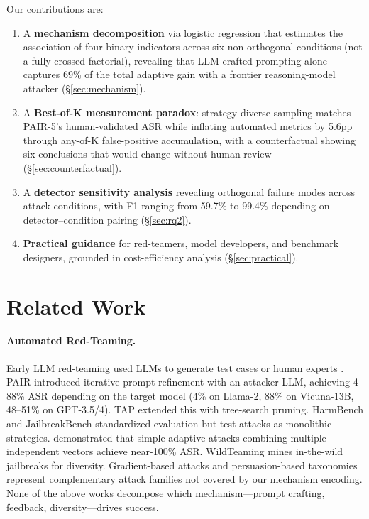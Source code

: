 \documentclass[11pt]{article}
\begin{document}
Our contributions are:

\begin{enumerate}
    \item A \textbf{mechanism decomposition} via logistic regression that estimates the association of four binary indicators across six non-orthogonal conditions (not a fully crossed factorial), revealing that LLM-crafted prompting alone captures 69\% of the total adaptive gain with a frontier reasoning-model attacker (\S\ref{sec:mechanism}).
    \item A \textbf{Best-of-K measurement paradox}: strategy-diverse sampling matches PAIR-5's human-validated ASR while inflating automated metrics by 5.6pp through any-of-K false-positive accumulation, with a counterfactual showing six conclusions that would change without human review (\S\ref{sec:counterfactual}).
    \item A \textbf{detector sensitivity analysis} revealing orthogonal failure modes across attack conditions, with F1 ranging from 59.7\% to 99.4\% depending on detector--condition pairing (\S\ref{sec:rq2}).
    \item \textbf{Practical guidance} for red-teamers, model developers, and benchmark designers, grounded in cost-efficiency analysis (\S\ref{sec:practical}).
\end{enumerate}

\section{Related Work}
\label{sec:related}

\paragraph{Automated Red-Teaming.}
Early LLM red-teaming used LLMs to generate test cases \cite{perez2022red} or human experts \cite{ganguli2022red}. PAIR \cite{chao2023jailbreaking} introduced iterative prompt refinement with an attacker LLM, achieving 4--88\% ASR depending on the target model (4\% on Llama-2, 88\% on Vicuna-13B, 48--51\% on GPT-3.5/4). TAP \cite{mehrotra2023tree} extended this with tree-search pruning. HarmBench \cite{mazeika2024harmbench} and JailbreakBench \cite{chao2024jailbreakbench} standardized evaluation but test attacks as monolithic strategies. \citet{andriushchenko2024jailbreaking} demonstrated that simple adaptive attacks combining multiple independent vectors achieve near-100\% ASR. WildTeaming \cite{jiang2024wildteaming} mines in-the-wild jailbreaks for diversity. Gradient-based attacks \cite{zou2023gcg} and persuasion-based taxonomies \cite{zeng2024persuade} represent complementary attack families not covered by our mechanism encoding. None of the above works decompose which mechanism---prompt crafting, feedback, diversity---drives success.
\end{document}
